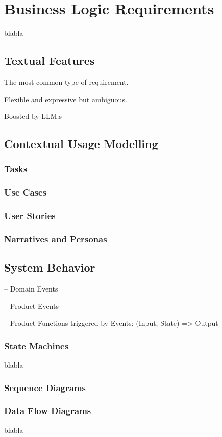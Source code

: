 
\chapter{Business Logic Requirements}%
blabla

\section{Textual Features}%

The most common type of requirement.

Flexible and expressive but ambiguous.

Boosted by LLM:s


\section{Contextual Usage Modelling}%

\subsection{Tasks}

\subsection{Use Cases}

\subsection{User Stories}

\subsection{Narratives and Personas}


\section{System Behavior}

-- Domain Events

-- Product Events

-- Product Functions triggered by Events: (Input, State) => Output

\subsection{State Machines}%
blabla 

\subsection{Sequence Diagrams}

\subsection{Data Flow Diagrams}%
blabla 


